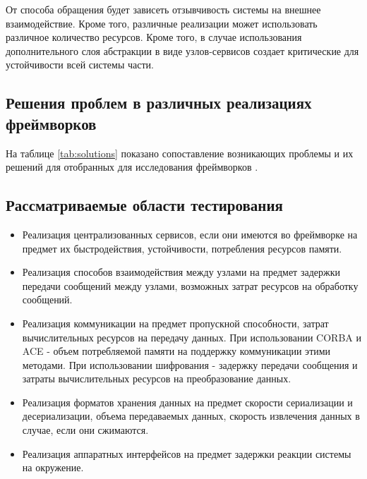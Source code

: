 От способа обращения будет зависеть отзывчивость системы на внешнее взаимодействие. Кроме того, различные реализации может использовать различное количество ресурсов. Кроме того, в случае использования дополнительного слоя абстракции в виде узлов-сервисов создает критические для устойчивости всей системы части.

\subsection{Решения проблем в различных реализациях фреймворков}

На таблице \ref{tab:solutions} показано сопоставление возникающих проблемы и их решений для отобранных для исследования фреймворков \cite{c1,c2,c4,c5,c6,c7}.

\subsection{Рассматриваемые области тестирования}
\begin{itemize}
	\item Реализация централизованных сервисов, если они имеются во фреймворке на предмет их быстродействия, устойчивости, потребления ресурсов памяти.
	\item Реализация способов взаимодействия между узлами на предмет задержки передачи сообщений между узлами, возможных затрат ресурсов на обработку сообщений.
	\item Реализация коммуникации на предмет пропускной способности, затрат вычислительных ресурсов на передачу данных. При использовании CORBA и ACE - объем потребляемой памяти на поддержку коммуникации этими методами. При использовании шифрования - задержку передачи сообщения и затраты вычислительных ресурсов на преобразование данных.
	\item Реализация форматов хранения данных на предмет скорости сериализации и десериализации, объема передаваемых данных, скорость извлечения данных в случае, если они сжимаются.
	\item Реализация аппаратных интерфейсов на предмет задержки реакции системы на окружение.	
\end{itemize}

